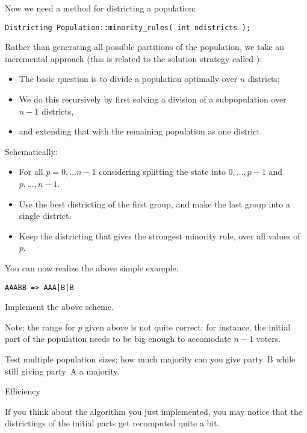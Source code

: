 Now we need a method for districting a population:
\begin{verbatim}
Districting Population::minority_rules( int ndistricts );
\end{verbatim}
Rather than generating all possible partitions of the population, we
take an incremental approach (this is related to the solution strategy
called ):
\begin{itemize}
\item The basic question is to divide a population optimally over $n$
  districts;
\item We do this recursively by first solving a division of a subpopulation over $n-1$
  districts,
  \item and extending that with the remaining population as one district.
\end{itemize}
Schematically:
\begin{itemize}
\item For all $p=0,\ldots n-1$ considering splitting the state into
  $0,\ldots,p-1$ and $p,\ldots,n-1$.
\item Use the best districting of the first group, and make the last
  group into a single district.
\item Keep the districting that gives the strongest minority rule,
  over all values of~$p$.
\end{itemize}

You can now realize the above simple example:
\begin{verbatim}
AAABB => AAA|B|B
\end{verbatim}

\begin{exercise}
  Implement the above scheme.

  Note: the range for $p$ given above is not quite correct: for instance,
  the initial part of the population needs to be big enough to
  accomodate $n-1$ voters.
\end{exercise}

\begin{exercise}
  Test multiple population sizes; how much majority can you give
  party~B while still giving party~A a majority.
\end{exercise}

 {Efficiency}

If you think about the algorithm you just implemented, you may notice
that the districtings of the initial parts get recomputed quite a bit.

